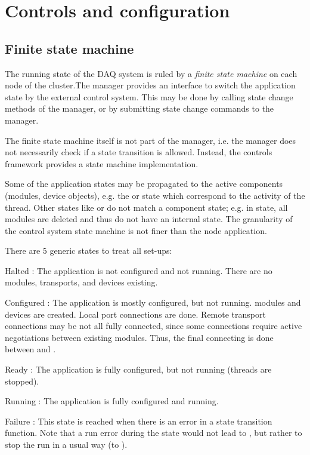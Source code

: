                
\section{Controls and configuration}
\subsection{Finite state machine}
\label{prog_fsm}
The running state of the DAQ system is ruled by a {\sl finite state machine} on 
each node of the cluster.The manager provides an interface to switch the application 
	 state by the external control system. This may be done by calling 
	 state change methods of the manager, or by submitting state change commands 
      to the manager.

The finite state machine itself is not part of the manager, 
      i.e. the manager does not necessarily check if a state transition 
      is allowed. Instead, the controls framework provides a 
      state machine implementation.

Some of the application states may be propagated to the 
      active components (modules, device objects), e.g. the 
       or  state which correspond to the activity of the thread. 
      Other states like  or  do not match a component state; 
      e.g. in  state, all modules are deleted and thus do not 
      have an internal state. The granularity of the control system state 
      machine is not finer than the node application.

There are 5 generic states to treat all set-ups: 
\begin{compactdesc}
\item[Halted] : The application is not configured and not running. 
	 There are no modules, transports, and devices existing.
\item[Configured] : The application is mostly configured, but not running. 
	 modules and devices are created. Local port connections are done.
	  Remote transport connections may be not all fully connected, 
	  since some connections require active negotiations between existing 
	  modules. Thus, the final connecting is done between 
	   and .  
\item[Ready] : The application is fully configured, but not running 
	 (threads are stopped).
\item[Running] : The application is fully configured and running.
\item[Failure] : This state is reached when there is an error in a 
	 state transition function. Note that a run error during the 
	  state would not lead to , but rather to stop 
	 the run in a usual way (to ).
\end{compactdesc}

